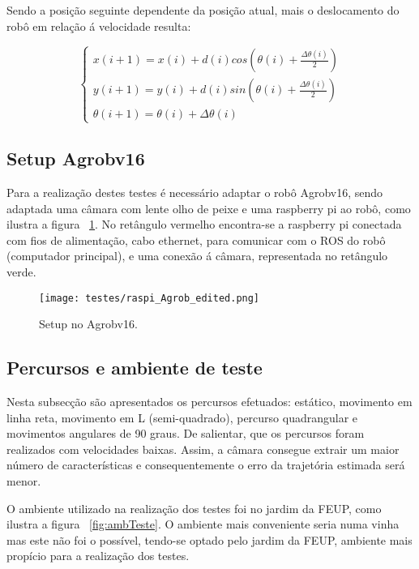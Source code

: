 Sendo a posição seguinte dependente da posição atual, mais o deslocamento do robô em relação á velocidade resulta:

\[ \left\{\begin{array}{ccc}
x(i+1) = x(i) + d(i) cos( \theta(i) + \frac{\Delta \theta(i)}{2})\\ 
y(i+1) = y(i) + d(i) sin( \theta(i) + \frac{\Delta \theta(i)}{2})\\ 
\theta (i+1) = \theta (i) + \Delta \theta (i)
\end{array}\right. \]



\subsection{Setup Agrobv16}


Para a realização destes testes é necessário adaptar o robô Agrobv16, sendo adaptada uma câmara com lente olho de peixe e uma raspberry pi ao robô, como ilustra a figura ~\ref{fig:adptPicam}. No retângulo vermelho encontra-se a raspberry pi conectada com fios de alimentação, cabo ethernet, para comunicar com o ROS do robô (computador principal), e uma conexão á câmara, representada no retângulo verde.


\begin{figure}[h!] 
	\begin{center}
		\leavevmode		
		\texttt{[image: testes/raspi\_Agrob\_edited.png]}
		\caption{Setup no Agrobv16.}
		\label{fig:adptPicam}
	\end{center}
\end{figure}


\FloatBarrier
\subsection{Percursos e ambiente de teste}


Nesta subsecção são apresentados os percursos efetuados: estático, movimento em linha reta, movimento em L (semi-quadrado), percurso quadrangular e movimentos angulares de 90 graus. De salientar, que os percursos foram realizados com velocidades baixas. Assim, a câmara consegue extrair um maior número de características e consequentemente o erro da trajetória estimada será menor. 


O ambiente utilizado na realização dos testes foi no  jardim da FEUP, como ilustra a figura ~\ref{fig:ambTeste}. O ambiente mais conveniente seria numa vinha mas este não foi o possível, tendo-se optado pelo jardim da FEUP, ambiente mais propício para a realização dos testes. 


